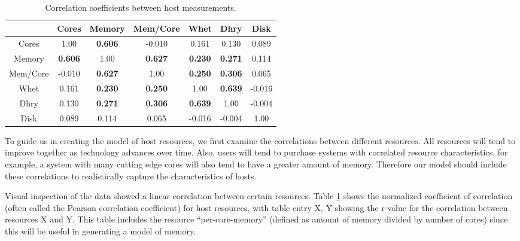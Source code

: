 \documentclass[conference]{IEEEtran}
\begin{document}
\begin{table}
\caption{Correlation coefficients between host measurements.}
\centering
\scriptsize
\begin{tabular}{|c|c|c|c|c|c|c|}
\hline
& Cores & Memory & Mem/Core & Whet & Dhry & Disk \\
\hline
Cores & 1.00 & \cellcolor[gray]{.7} \textbf{0.606} & -0.010 & 0.161 & 0.130 & 0.089 \\
\hline
Memory & \cellcolor[gray]{.7} \textbf{0.606} & 1.00 &  \cellcolor[gray]{.7} \textbf{0.627} & \cellcolor[gray]{.9} \textbf{ 0.230} & \cellcolor[gray]{.9} \textbf{ 0.271} & 0.114 \\
\hline
Mem/Core & -0.010 & \cellcolor[gray]{.7} \textbf{ 0.627} & 1.00 & \cellcolor[gray]{.9} \textbf{ 0.250} & \cellcolor[gray]{.9} \textbf{ 0.306 }& 0.065 \\
\hline
Whet & 0.161 & \cellcolor[gray]{.9} \textbf{ 0.230 }&  \cellcolor[gray]{.9} \textbf{ 0.250 }& 1.00 & \cellcolor[gray]{.7} \textbf{ 0.639 }& -0.016 \\
\hline
Dhry & 0.130 & \cellcolor[gray]{.9} \textbf{ 0.271} & \cellcolor[gray]{.9} \textbf{ 0.306} & \cellcolor[gray]{.7} \textbf{ 0.639} & 1.00 & -0.004 \\
\hline
Disk & 0.089 & 0.114 & 0.065 & -0.016 & -0.004 & 1.00 \\
\hline
\end{tabular}
\label{corr-table}
\end{table}

To guide us in creating the model of host resources, we first examine the correlations between different resources.  All resources will tend to improve together as technology advances over time.  Also, users will tend to purchase systems with correlated resource characteristics, for example, a system with many cutting edge cores will also tend to have a greater amount of memory.  Therefore our model should include these correlations to realistically capture the characteristics of hosts.

Visual inspection of the data showed a linear correlation between certain resources.  Table \ref{corr-table} shows the normalized coefficient of correlation (often called the Pearson correlation coefficient) for host resources, with table entry X, Y showing the r-value for the correlation between resources X and Y.  This table includes the resource ``per-core-memory'' (defined as amount of memory divided by number of cores) since this will be useful in generating a model of memory.
\end{document}
